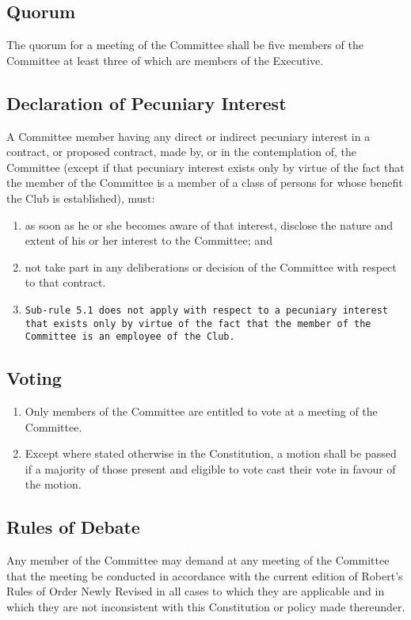 \documentclass[11pt]{article} %
\begin{document}
\subsection{Quorum}
The quorum for a meeting of the Committee shall be five members of the Committee at least three of which are members of the Executive.

\subsection{Declaration of Pecuniary Interest}
A Committee member having any direct or indirect pecuniary interest in a contract, or proposed contract, made by, or in the contemplation of, the Committee (except if that pecuniary interest exists only by virtue of the fact that the member of the Committee is a member of a class of persons for whose benefit the Club is established), must:
\begin{enumerate}
	\item as soon as he or she becomes aware of that interest, disclose the nature and extent of his or her interest to the Committee; and
	\item not take part in any deliberations or decision of the Committee with respect to that contract.
	\item[] \texttt{Sub-rule 5.1 does not apply with respect to a pecuniary interest that exists only by virtue of the fact that the member of the Committee is an employee of the Club.}
\end{enumerate}

\subsection{Voting}
\begin{enumerate}
	\item Only members of the Committee are entitled to vote at a meeting of the Committee.
	\item Except where stated otherwise in the Constitution, a motion shall be passed if a majority of those present and eligible to vote cast their vote in favour of the motion.
\end{enumerate}

\subsection{Rules of Debate}
Any member of the Committee may demand at any meeting of the Committee that the meeting be conducted in accordance with the current edition of Robert’s Rules of Order Newly Revised in all cases to which they are applicable and in which they are not inconsistent with this Constitution or policy made thereunder.
\end{document}
